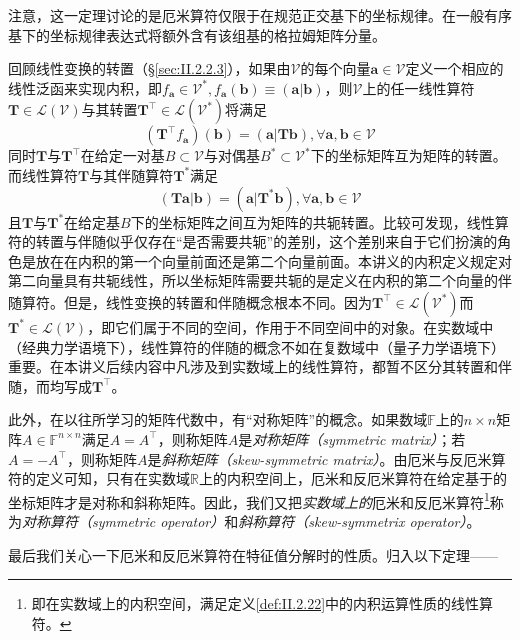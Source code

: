 \documentclass[main.tex]{subfiles}
\begin{document}
注意，这一定理讨论的是厄米算符仅限于在规范正交基下的坐标规律。在一般有序基下的坐标规律表达式将额外含有该组基的格拉姆矩阵分量。

回顾线性变换的转置（\S\ref{sec:II.2.2.3}），如果由$\mathcal{V}$的每个向量$\mathbf{a}\in\mathcal{V}$定义一个相应的线性泛函来实现内积，即$f_\mathbf{a}\in\mathcal{V}^*,f_\mathbf{a}\left(\mathbf{b}\right)\equiv\left(\mathbf{a}|\mathbf{b}\right)$，则$\mathcal{V}$上的任一线性算符$\mathbf{T}\in\mathcal{L}\left(\mathcal{V}\right)$与其转置$\mathbf{T}^\intercal\in\mathcal{L}\left(\mathcal{V}^*\right)$将满足
\[
    \left(\mathbf{T}^\intercal f_\mathbf{a}\right)\left(\mathbf{b}\right)=\left(\mathbf{a}|\mathbf{Tb}\right),\forall\mathbf{a},\mathbf{b}\in\mathcal{V}
\]
同时$\mathbf{T}$与$\mathbf{T}^\intercal$在给定一对基$B\subset\mathcal{V}$与对偶基$B^*\subset\mathcal{V}^*$下的坐标矩阵互为矩阵的转置。而线性算符$\mathbf{T}$与其伴随算符$\mathbf{T}^*$满足
\[
    \left(\mathbf{Ta}|\mathbf{b}\right)=\left(\mathbf{a}|\mathbf{T}^*\mathbf{b}\right),\forall\mathbf{a},\mathbf{b}\in\mathcal{V}
\]
且$\mathbf{T}$与$\mathbf{T}^*$在给定基$B$下的坐标矩阵之间互为矩阵的共轭转置。比较可发现，线性算符的转置与伴随似乎仅存在“是否需要共轭”的差别，这个差别来自于它们扮演的角色是放在在内积的第一个向量前面还是第二个向量前面。本讲义的内积定义规定对第二向量具有共轭线性，所以坐标矩阵需要共轭的是定义在内积的第二个向量的伴随算符。但是，线性变换的转置和伴随概念根本不同。因为$\mathbf{T}^\intercal\in\mathcal{L}\left(\mathcal{V}^*\right)$而$\mathbf{T}^*\in\mathcal{L}\left(\mathcal{V}\right)$，即它们属于不同的空间，作用于不同空间中的对象。在实数域中（经典力学语境下），线性算符的伴随的概念不如在复数域中（量子力学语境下）重要。在本讲义后续内容中凡涉及到实数域上的线性算符，都暂不区分其转置和伴随，而均写成$\mathbf{T}^\intercal$。

此外，在以往所学习的矩阵代数中，有“对称矩阵”的概念。如果数域$\mathbb{F}$上的$n\times n$矩阵$A\in\mathbb{F}^{n\times n}$满足$A=A^\intercal$，则称矩阵$A$是\emph{对称矩阵（symmetric matrix）}；若$A=-A^\intercal$，则称矩阵$A$是\emph{斜称矩阵（skew-symmetric matrix）}。由厄米与反厄米算符的定义可知，只有在实数域$\mathbb{R}$上的内积空间上，厄米和反厄米算符在给定基于的坐标矩阵才是对称和斜称矩阵。因此，我们又把\emph{实数域上的}厄米和反厄米算符\footnote{即在实数域上的内积空间，满足定义\ref{def:II.2.22}中的内积运算性质的线性算符。}称为\emph{对称算符（symmetric operator）}和\emph{斜称算符（skew-symmetrix operator）}。

最后我们关心一下厄米和反厄米算符在特征值分解时的性质。归入以下定理——
\end{document}
